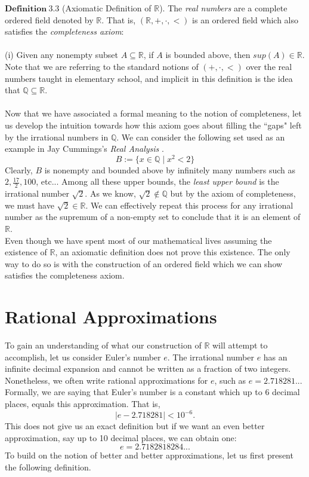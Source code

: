 \documentclass[12pt]{article}
\theoremstyle{definition}
\theoremstyle{remark}
\begin{document}
 \noindent $\mathbf{Definition\ 3.3}$ (Axiomatic Definition of $\mathbb{R}$)\cite[pg.22 \& 24]{paper}. The \textit{real numbers} are a complete ordered field denoted by $\mathbb{R}$. That is, $(\mathbb{R}, +, \cdot, <)$ is an ordered field which also satisfies the \textit{completeness axiom}:\\\\
(i) Given any nonempty subset $A\subseteq\mathbb{R}$, if $A$ is bounded above, then $sup(A)\in\mathbb{R}$.\\

\noindent Note that we are referring to the standard notions of $(+,\cdot, <)$ over the real numbers taught in elementary school, and implicit in this definition is the idea that $\mathbb{Q}\subseteq\mathbb{R}$.\\\\ 
\noindent Now that we have associated a formal meaning to the notion of completeness, let us develop the intuition towards how this axiom goes about filling the ``gaps" left by the irrational numbers in $\mathbb{Q}$. We can consider the following set used as an example in Jay Cummings's \textit{Real Analysis} \cite[pg.19-22]{paper}. 
$$B:=\{x\in\mathbb{Q}\mid x^2<2\}$$
Clearly, $B$ is nonempty and bounded above by infinitely many numbers such as $2, \frac{17}{2}, 100$, etc... Among all these upper bounds, the \textit{least upper bound} is the irrational number $\sqrt{2}$. As we know, $\sqrt{2}\not\in\mathbb{Q}$ but by the axiom of completeness, we must have $\sqrt{2}\in\mathbb{R}$. We can effectively repeat this process for any irrational number as the supremum of a non-empty set to conclude that it is an element of $\mathbb{R}$.\\

\noindent Even though we have spent most of our mathematical lives assuming the existence of $\mathbb{R}$, an axiomatic definition does not prove this existence. The only way to do so is with the construction of an ordered field which we can show satisfies the completeness axiom. 

\section{Rational Approximations}
To gain an understanding of what our construction of $\mathbb{R}$ will attempt to accomplish, let us consider Euler's number $e$. The irrational number $e$ has an infinite decimal expansion and cannot be written as a fraction of two integers. Nonetheless, we often write rational approximations for $e$, such as $e=2.718281$... Formally, we are saying that Euler's number is a constant which up to 6 decimal places, equals this approximation. That is, $$|e-2.718281|<10^{-6}.$$ This does not give us an exact definition but if we want an even better approximation, say up to 10 decimal places, we can obtain one:
$$e=2.7182818284...$$
To build on the notion of better and better approximations, let us first present the following definition.\\
\end{document}
